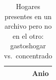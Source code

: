\begin{table}[ht]
\centering
\caption{Hogares presentes en un archivo pero no en el otro: gastoshogar vs.~concentrado} 
\label{tab:16_consistencia_gh_concentrado}
\begin{tabular}{r}
  \toprule
Anio \\ 
  \midrule
 \bottomrule
\end{tabular}
\end{table}
